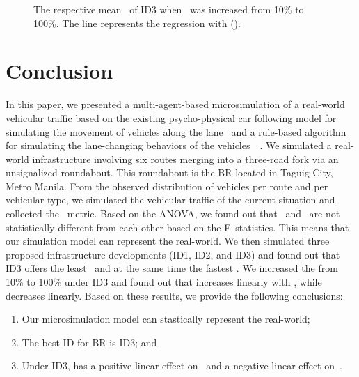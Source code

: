 \documentclass[preprint]{./acm_proc_article-sp}
\begin{document}
\begin{figure}[bth]
\centering{}
\caption{The respective mean~ of ID3 when~ was increased from 10\% to 100\%. The line represents the regression with  ().}\label{fig:regress2}
\end{figure}

\section{Conclusion}\label{sec:conclude}

In this paper, we presented a multi-agent-based microsimulation of a real-world vehicular traffic based on the existing psycho-physical car following model for simulating the movement of vehicles along the lane~\citep{fritzsche94,gipps81} and a rule-based algorithm for simulating the lane-changing behaviors of the vehicles~~\citep{alshihabi03,VISSIM90}. We simulated a real-world infrastructure involving six routes merging into a three-road fork via an unsignalized roundabout. This roundabout is the BR located in Taguig City, Metro Manila. From the observed distribution of vehicles per route and per vehicular type, we simulated the vehicular traffic of the current situation and collected the~ metric. Based on the ANOVA, we found out that~ and~ are not statistically different from each other based on the F~statistics. This means that our simulation model can represent the real-world. We then simulated three proposed infrastructure developments (ID1, ID2, and ID3) and found out that ID3 offers the least~ and at the same time the fastest . We increased the  from 10\% to 100\% under ID3 and found out that  increases linearly with , while  decreases linearly. Based on these results, we provide the following conclusions:
\begin{enumerate}
\item Our microsimulation model can stastically represent the real-world;
\item The best ID for BR is ID3; and
\item Under ID3,  has a positive linear effect on~ and a negative linear effect on~.
\end{enumerate}
\end{document}
